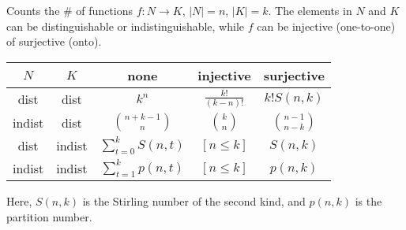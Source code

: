 Counts the \# of functions $f:N\rightarrow K$, $|N|=n$, $|K|=k$. The elements in $N$ and $K$ can be distinguishable or indistinguishable, while $f$ can be injective (one-to-one) of surjective (onto).
\begin{center}
\begin{tabular}{cc|ccc}
	$N$ & $K$ & none & injective & surjective\\
	\hline
	dist & dist & $k^n$ & $\frac{k!}{(k-n)!}$ & $k!S(n,k)$\\
	indist & dist & $\binom{n+k-1}{n}$ & $\binom{k}{n}$ & $\binom{n-1}{n-k}$\\
	dist & indist & $\sum_{t=0}^k S(n,t)$ & $[n\leq k]$ & $S(n,k)$\\
	indist & indist & $\sum_{t=1}^k p(n,t)$ & $[n\leq k]$ & $p(n,k)$\\
\end{tabular}
\end{center}
Here, $S(n,k)$ is the Stirling number of the second kind, and $p(n,k)$ is the partition number.
